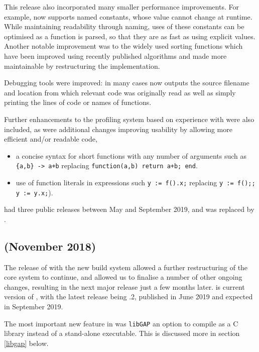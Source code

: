 \documentclass{deliverablereport}
\begin{document}
This release also incorporated many smaller performance improvements. For example,
\GAP now supports named constants, whose value cannot change 
at runtime. While maintaining readability through naming, uses of
these constants can be optimised as a function is parsed, so that they
are as fast as using explicit values. Another notable improvement was
to the widely used  sorting functions which have been improved using
recently published algorithms and made more maintainable by
restructuring the implementation.

Debugging  tools were improved: in many cases \GAP now outputs the
source filename  and location from which relevant code was originally
read as well as simply printing the lines of code or names of functions.

Further enhancements to the profiling system based on experience with
 were also included, as were additional changes improving \GAP
usability by allowing more
efficient and/or readable code,
\begin{itemize}
  \item a concise syntax for short
functions with any number of arguments such as \verb|{a,b} -> a+b| replacing \verb|function(a,b) return a+b; end|. 

\item use of function literals in expressions such \verb|y := f().x;| 
replacing \verb|y := f();; y := y.x;|).
\end{itemize}

 had three public releases between May and September 2019, and
was replaced by .

\subsection{ (November 2018)}\label{gap-4.10}

The release of  with the new build system allowed a
further restructuring of the core \GAP system to continue, and allowed
us to finalise a number of other ongoing changes, 
 resulting in the 
next major release just a few months later.  is current version
of \GAP, with the latest release being .2, published in June
2019 and  expected in September 2019.

The most important new feature in  was \texttt{libGAP} an
option to compile \GAP as a C library instead of a stand-alone
executable. This is discussed more in section \ref{libgap} below.
\end{document}
